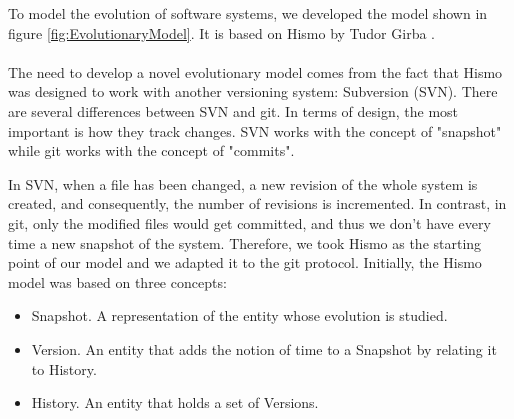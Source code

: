 To model the evolution of software systems, we developed the model 
shown in figure \ref{fig:EvolutionaryModel}. It is based on Hismo by Tudor Girba \cite{Girba2005}.\\
\\
The need to develop a novel evolutionary model comes from the fact that Hismo was designed to work with another versioning system: Subversion (SVN). 
There are several differences between SVN and git. In terms of design, the most important is how they track changes. 
SVN works with the concept of "snapshot" while git works with the concept of "commits".


In SVN, when a file has been changed, a new revision of the whole system is created, and consequently, the number of revisions is incremented. 
In contrast, in git, only the modified files would get committed, and thus we don't have every time a new snapshot of the system. 
Therefore, we took Hismo as the starting point of our model and we adapted it to the git protocol. 
Initially, the Hismo model was based on three concepts:
\begin{itemize}
    \item Snapshot. A representation of the entity whose evolution is studied.
    \item Version. An entity that adds the notion of time to a Snapshot by relating it to History. 
    \item History. An entity that holds a set of Versions.
\end{itemize}


